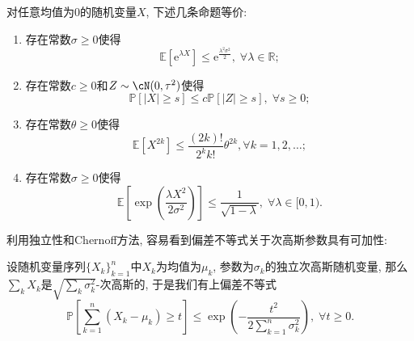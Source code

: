 \begin{theorem}[次高斯随机变量的等价定义]
	对任意均值为$0$的随机变量$X$, 下述几条命题等价: 
	\begin{enumerate}[label=(\Roman*)]
		\item 存在常数$\sigma \geq 0$使得
			\begin{equation*}
				\mathbb{E}[\mathrm{e}^{\lambda X} ] \leq \mathrm{e}^{\frac{\lambda^2 \sigma^2}{2}},\; \forall \lambda \in \mathbb{R}; 
			\end{equation*}
		\item 存在常数$c \geq 0$和$Z \sim \cN(0, \tau^2)$使得
			\begin{equation*}
				\mathbb{P}[|X| \geq s] \leq c \mathbb{P}[|Z| \geq s],\; \forall s \geq 0; 
			\end{equation*}
		\item 存在常数$\theta \geq 0$使得
			\begin{equation*}
				\mathbb{E}[X^{2k}] \leq \frac{(2k)!}{2^k k!} \theta^{2k}, \forall k = 1,2,\dots;
			\end{equation*}
		\item 存在常数$\sigma \geq 0$使得
			\begin{equation*}
				\mathbb{E}\left[ \exp\left(\frac{\lambda X^2}{2 \sigma^2}\right) \right] \leq \frac{1}{\sqrt{1 - \lambda}},\; \forall \lambda \in [0,1).
			\end{equation*}
	\end{enumerate}
\end{theorem}

利用独立性和Chernoff方法, 容易看到偏差不等式关于次高斯参数具有可加性: 
\begin{proposition}[Hoeffding界]\label{thm:HoeffdingBd}
	设随机变量序列$\{X_k\}_{k=1}^n$中$X_k$为均值为$\mu_k$, 参数为$\sigma_k$的独立次高斯随机变量, 那么$\sum_k X_k$是$\sqrt{\sum_k \sigma_k^2}$-次高斯的, 于是我们有上偏差不等式
	\begin{equation*}
		\mathbb{P} \left[ \sum_{k=1}^n (X_k - \mu_k) \geq t \right]
		\leq \exp \left( - \frac{t^2}{2 \sum_{k=1}^n \sigma_k^2} \right ),\; 
		\forall t \geq 0.
	\end{equation*}
\end{proposition}

